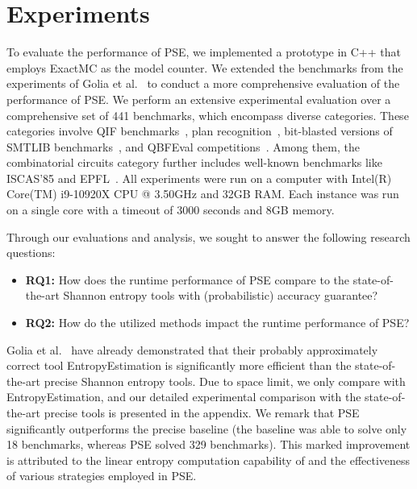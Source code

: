 \section{Experiments}
\label{sec:Experiments}

To evaluate the performance of PSE, we implemented a prototype in C++ that employs ExactMC as the model counter.
We extended the benchmarks from the experiments of Golia et al.~\cite{golia2022scalable} to conduct a more comprehensive evaluation of the performance of PSE. 
We perform an extensive experimental evaluation over a comprehensive set of 441 benchmarks, which encompass diverse categories. These categories involve QIF benchmarks~\cite{fremont2017maximum}, plan recognition~\cite{soos2020tinted}, bit-blasted versions of SMTLIB benchmarks~\cite{sharma2019ganak}, and QBFEval competitions~\cite{golia2022scalable}. Among them, the combinatorial circuits category further includes well-known benchmarks like ISCAS'85 and EPFL~\cite{amaru2015epfl,brglez1989combinational}.
All experiments were run on a computer with Intel(R) Core(TM) i9-10920X CPU @ 3.50GHz and 32GB RAM.
Each instance was run on a single core with a timeout of 3000 seconds and 8GB memory.

Through our evaluations and analysis, we sought to answer the following research questions:
\begin{itemize}
	\item \textbf{RQ1:} How does the runtime performance of PSE compare to the state-of-the-art Shannon entropy tools with (probabilistic) accuracy guarantee?
	\item \textbf{RQ2:} How do the utilized methods impact the runtime performance of PSE? 
\end{itemize}

Golia et al.~\cite{golia2022scalable} have already demonstrated that their probably approximately correct tool EntropyEstimation is significantly more efficient than the state-of-the-art precise Shannon entropy tools. 
Due to space limit, we only compare with EntropyEstimation, and our detailed experimental comparison with the state-of-the-art precise tools is presented in the appendix.
We remark that PSE significantly outperforms the precise baseline (the baseline was able to solve only 18 benchmarks, whereas PSE solved 329 benchmarks). 
This marked improvement is attributed to the linear entropy computation capability of \ADDAND and the effectiveness of various strategies employed in PSE.

